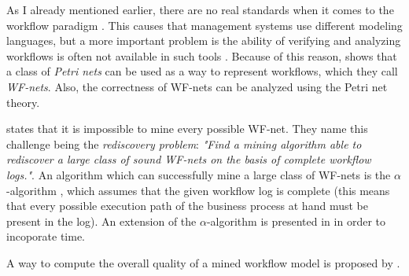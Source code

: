 \documentclass[a4paper,11pt]{article}
\begin{document}
As I already mentioned earlier, there are no real standards when it comes to the workflow paradigm \cite{VanderAalst1997}. This causes that management systems use different modeling languages, but a more important problem is the ability of verifying and analyzing workflows is often not available in such tools \cite{VanderAalst1997}. Because of this reason, \cite{VanderAalst1997} shows that a class of \textit{Petri nets} can be used as a way to represent workflows, which they call \textit{WF-nets}. Also, the correctness of WF-nets can be analyzed using the Petri net theory.


\cite{VanDerAalst2002} states that it is impossible to mine every possible WF-net. They name this challenge being the \textit{rediscovery problem}: \textit{"Find a mining algorithm able to rediscover a large class of sound WF-nets on the basis of complete workflow logs."}\cite{VanDerAalst2002}. An algorithm which can successfully mine a large class of WF-nets is the $\alpha$-algorithm \cite{VanderAalst2003,VanDerAalst2002, VanderAalst2002TimedLogs}, which assumes that the given workflow log is complete (this means that every possible execution path of the business process at hand must be present in the log). An extension of the $\alpha$-algorithm is presented in \cite{VanderAalst2002TimedLogs} in order to incoporate time. 

A way to compute the overall quality of a mined workflow model is proposed by \cite{VanderAalst2003}.







\end{document}
